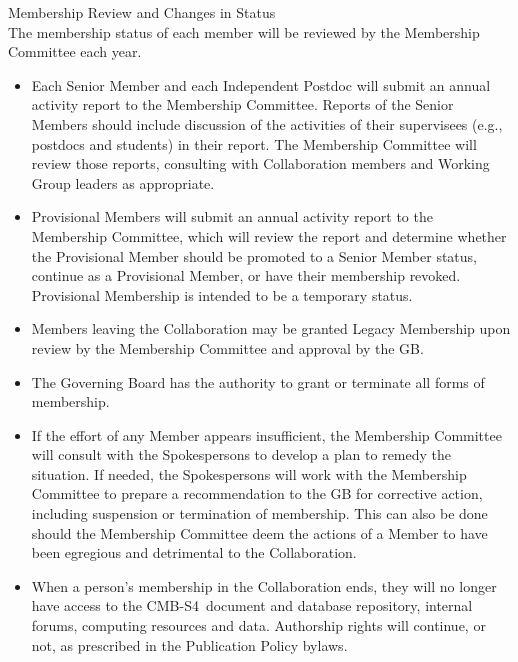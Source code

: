 \documentclass[12pt]{article}
\newcommand\collabname{CMB-S4}
\begin{document}
{{{\large {} Membership Review and Changes in Status}\\

The membership status of each member will be reviewed by the Membership Committee each year. 

\begin{itemize} 

\item Each Senior Member and each Independent Postdoc will submit an annual activity report to the Membership Committee. Reports of the Senior Members should include discussion of the activities of their supervisees (e.g., postdocs and students) in their report. The Membership Committee will review those reports, consulting with Collaboration members and Working Group leaders as appropriate.
  
\item Provisional Members will submit an annual activity report to the Membership Committee, which will review the report and determine whether the Provisional Member should be promoted to a Senior Member status, continue as a Provisional Member, or have their membership revoked.  Provisional Membership is intended to be a temporary status.

\item Members leaving the Collaboration may be granted Legacy Membership upon review by the Membership Committee and approval by the GB.

\item The Governing Board has the authority to grant or terminate all forms of membership.

\item If the effort of any Member appears insufficient, the Membership Committee will consult with the Spokespersons to develop a plan to remedy the situation.  If needed, the Spokespersons will work with the Membership Committee to prepare a recommendation to the GB for corrective action, including suspension or termination of membership.   This can also be done should the Membership Committee deem the actions of a Member to have been egregious and detrimental to the Collaboration.

\item When a person's membership in the Collaboration ends, they will no longer have access to the \collabname\ document and database repository, internal forums, computing resources and data.  Authorship rights will continue, or not, as prescribed in the Publication Policy bylaws.


\end{itemize}}}
\end{document}
